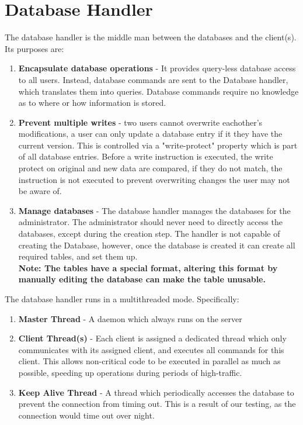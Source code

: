 \documentclass[letterpaper]{report}
\begin{document}
	\section{Database Handler}
	The database handler is the middle man between the databases and the client(s). Its purposes are:
	\begin{enumerate}
		\item \textbf{Encapsulate database operations} - It provides query-less database access to all users. Instead, database commands are sent to the Database handler, which translates them into queries. Database commands require no knowledge as to where or how information is stored.
		\item \textbf{Prevent multiple writes} - two users cannot overwrite eachother's modifications, a user can only update a database entry if it they have the current version. This is controlled via a "write-protect" property which is part of all database entries. Before a write instruction is executed, the write protect on original and new data are compared, if they do not match, the instruction is not executed to prevent overwriting changes the user may not be aware of.
		\item \textbf{Manage databases} - The database handler manages the databases for the administrator. The administrator should never need to directly access the databases, except during the creation step. The handler is not capable of creating the Database, however, once the database is created it can create all required tables, and set them up. \\ \textbf{Note: The tables have a special format, altering this format by manually editing the database can make the table unusable.}
	\end{enumerate}
	The database handler runs in a multithreaded mode. Specifically:
	\begin{enumerate}
		\item \textbf{Master Thread} - A daemon which always runs on the server
		\item \textbf{Client Thread(s)} - Each client is assigned a dedicated thread which only communicates with its assigned client, and executes all commands for this client. This allows non-critical code to be executed in parallel as much as possible, speeding up operations during periods of high-traffic.
		\item \textbf{Keep Alive Thread} - A thread which periodically accesses the database to prevent the connection from timing out. This is a result of our testing, as the connection would time out over night.
	\end{enumerate}
\end{document}
